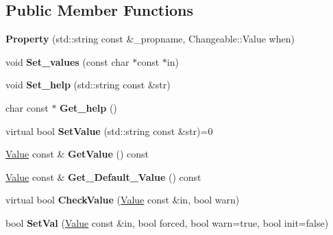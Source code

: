 \subsection*{Public Member Functions}
\begin{DoxyCompactItemize}
\item 
\hypertarget{classProperty_ab65733010b8ea50392b4ea43536c0008}{{\bfseries Property} (std\-::string const \&\-\_\-propname, Changeable\-::\-Value when)}\label{classProperty_ab65733010b8ea50392b4ea43536c0008}

\item 
\hypertarget{classProperty_ae192c83aeb5086ca074c4daa85007de2}{void {\bfseries Set\-\_\-values} (const char $\ast$const $\ast$in)}\label{classProperty_ae192c83aeb5086ca074c4daa85007de2}

\item 
\hypertarget{classProperty_a023caf411f40d81346633b68cf83693d}{void {\bfseries Set\-\_\-help} (std\-::string const \&str)}\label{classProperty_a023caf411f40d81346633b68cf83693d}

\item 
\hypertarget{classProperty_aab5b856b424137c47781709ad5f7be6d}{char const $\ast$ {\bfseries Get\-\_\-help} ()}\label{classProperty_aab5b856b424137c47781709ad5f7be6d}

\item 
\hypertarget{classProperty_ab36313503e43bc6c1294c23d5dba323f}{virtual bool {\bfseries Set\-Value} (std\-::string const \&str)=0}\label{classProperty_ab36313503e43bc6c1294c23d5dba323f}

\item 
\hypertarget{classProperty_a8972c72f3a4d10e20782cb7dc7800bea}{\hyperlink{classValue}{Value} const \& {\bfseries Get\-Value} () const }\label{classProperty_a8972c72f3a4d10e20782cb7dc7800bea}

\item 
\hypertarget{classProperty_a665dc0efff99aa4e29162bf87b287f9b}{\hyperlink{classValue}{Value} const \& {\bfseries Get\-\_\-\-Default\-\_\-\-Value} () const }\label{classProperty_a665dc0efff99aa4e29162bf87b287f9b}

\item 
\hypertarget{classProperty_a67e207a6e4769d506d66c9cd2885152e}{virtual bool {\bfseries Check\-Value} (\hyperlink{classValue}{Value} const \&in, bool warn)}\label{classProperty_a67e207a6e4769d506d66c9cd2885152e}

\item 
\hypertarget{classProperty_a44cd119ea8457d7d2e637916f079eb46}{bool {\bfseries Set\-Val} (\hyperlink{classValue}{Value} const \&in, bool forced, bool warn=true, bool init=false)}\label{classProperty_a44cd119ea8457d7d2e637916f079eb46}


\end{DoxyCompactItemize}
